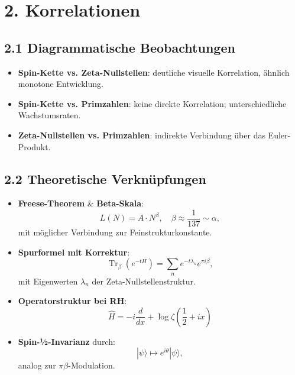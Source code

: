 \documentclass[12pt]{article}
\begin{document}
\section*{2. Korrelationen}

\subsection*{2.1 Diagrammatische Beobachtungen}
\begin{itemize}
  \item \textbf{Spin-Kette vs. Zeta-Nullstellen}: deutliche visuelle Korrelation, ähnlich monotone Entwicklung.
  \item \textbf{Spin-Kette vs. Primzahlen}: keine direkte Korrelation; unterschiedliche Wachstumsraten.
  \item \textbf{Zeta-Nullstellen vs. Primzahlen}: indirekte Verbindung über das Euler-Produkt.
\end{itemize}

\subsection*{2.2 Theoretische Verknüpfungen}
\begin{itemize}
  \item \textbf{Freese-Theorem} \& \textbf{Beta-Skala}:
  \[
  L(N) = A \cdot N^{\beta}, \quad \beta \approx \frac{1}{137} \sim \alpha,
  \]
  mit möglicher Verbindung zur Feinstrukturkonstante.
  \item \textbf{Spurformel mit Korrektur}:
  \[
  \operatorname{Tr}_\beta(e^{-tH}) = \sum_n e^{-t\lambda_n} e^{\pi i \beta},
  \]
  mit Eigenwerten \( \lambda_n \) der Zeta-Nullstellenstruktur.
  \item \textbf{Operatorstruktur bei RH}:
  \[
  \hat{H} = -i\frac{d}{dx} + \log \zeta\left(\frac{1}{2} + ix\right)
  \]
  \item \textbf{Spin-½-Invarianz} durch:
  \[
  |\psi\rangle \mapsto e^{i\theta} |\psi\rangle,
  \]
  analog zur \( \pi\beta \)-Modulation.
\end{itemize}
\end{document}
